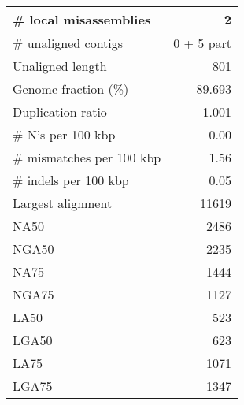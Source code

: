 \documentclass[12pt,a4paper]{article}
\begin{document}
\begin{table}[ht]
\begin{center}
\begin{tabular}{|l*{1}{|r}|}
\# local misassemblies & 2 \\ \hline
\# unaligned contigs & 0 + 5 part \\ \hline
Unaligned length & 801 \\ \hline
Genome fraction (\%) & 89.693 \\ \hline
Duplication ratio & 1.001 \\ \hline
\# N's per 100 kbp & 0.00 \\ \hline
\# mismatches per 100 kbp & 1.56 \\ \hline
\# indels per 100 kbp & 0.05 \\ \hline
Largest alignment & 11619 \\ \hline
NA50 & 2486 \\ \hline
NGA50 & 2235 \\ \hline
NA75 & 1444 \\ \hline
NGA75 & 1127 \\ \hline
LA50 & 523 \\ \hline
LGA50 & 623 \\ \hline
LA75 & 1071 \\ \hline
LGA75 & 1347 \\ \hline
\end{tabular}
\end{center}
\end{table}
\end{document}
